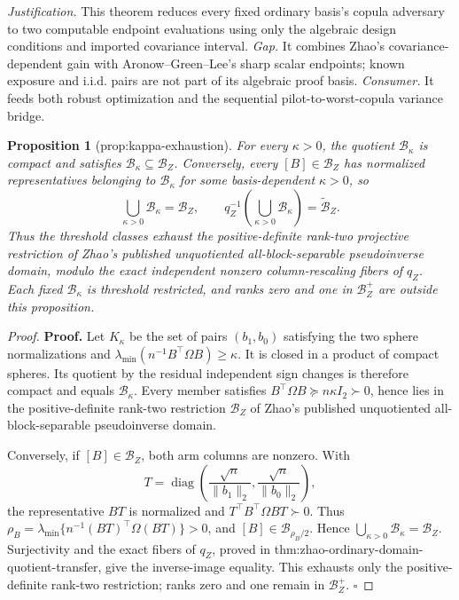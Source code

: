 \documentclass{article}
\newtheorem{proposition}{Proposition}
\begin{document}
\par\smallskip\noindent \textit{Justification.} This theorem reduces every fixed ordinary basis's copula adversary to two computable endpoint evaluations using only the algebraic design conditions and imported covariance interval. \textit{Gap.} It combines Zhao's covariance-dependent gain with Aronow--Green--Lee's sharp scalar endpoints; known exposure and i.i.d. pairs are not part of its algebraic proof basis. \textit{Consumer.} It feeds both robust optimization and the sequential pilot-to-worst-copula variance bridge.

\begin{proposition}[prop:kappa-exhaustion]\label{prop:kappa-exhaustion}
For every \(\kappa>0\), the quotient \(\mathcal B_\kappa\) is compact and satisfies \(\mathcal B_\kappa\subseteq\mathcal B_Z\).  Conversely, every \([B]\in\mathcal B_Z\) has normalized representatives belonging to \(\mathcal B_\kappa\) for some basis-dependent \(\kappa>0\), so
\[
\bigcup_{\kappa>0}\mathcal B_\kappa=\mathcal B_Z,
\qquad
q_Z^{-1}\!\left(\bigcup_{\kappa>0}\mathcal B_\kappa\right)=\widetilde{\mathcal B}_Z.
\]
Thus the threshold classes exhaust the positive-definite rank-two projective restriction of Zhao's published unquotiented all-block-separable pseudoinverse domain, modulo the exact independent nonzero column-rescaling fibers of \(q_Z\).  Each fixed \(\mathcal B_\kappa\) is threshold restricted, and ranks zero and one in \(\mathcal B_Z^+\) are outside this proposition.
\end{proposition}
\begin{proof}
\textbf{Proof.}
Let \(K_\kappa\) be the set of pairs \((b_1,b_0)\) satisfying the two sphere normalizations and \(\lambda_{\min}(n^{-1}B^\top\Omega B)\ge\kappa\).  It is closed in a product of compact spheres.  Its quotient by the residual independent sign changes is therefore compact and equals \(\mathcal B_\kappa\).  Every member satisfies \(B^\top\Omega B\succeq n\kappa I_2\succ0\), hence lies in the positive-definite rank-two restriction \(\mathcal B_Z\) of Zhao's published unquotiented all-block-separable pseudoinverse domain.

Conversely, if \([B]\in\mathcal B_Z\), both arm columns are nonzero.  With
\[
T=\operatorname{diag}\left(\frac{\sqrt n}{\lVert b_1\rVert_2},
\frac{\sqrt n}{\lVert b_0\rVert_2}\right),
\]
the representative \(BT\) is normalized and \(T^\top B^\top\Omega BT\succ0\).  Thus \(\rho_B=\lambda_{\min}\{n^{-1}(BT)^\top\Omega(BT)\}>0\), and \([B]\in\mathcal B_{\rho_B/2}\).  Hence \(\bigcup_{\kappa>0}\mathcal B_\kappa=\mathcal B_Z\).  Surjectivity and the exact fibers of \(q_Z\), proved in thm:zhao-ordinary-domain-quotient-transfer, give the inverse-image equality.  This exhausts only the positive-definite rank-two restriction; ranks zero and one remain in \(\mathcal B_Z^+\). \(\square\)
\end{proof}
\end{document}

